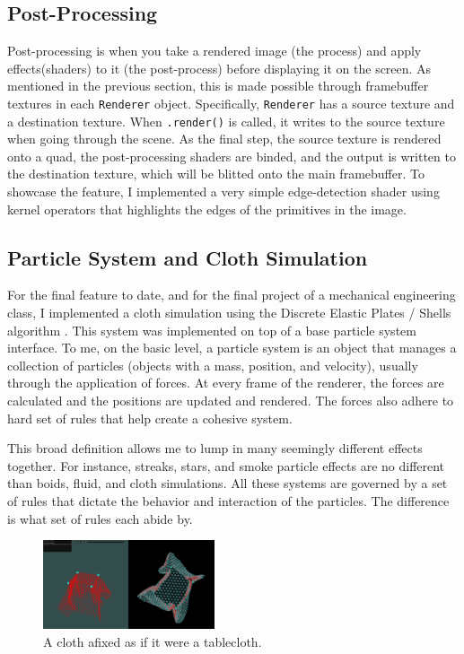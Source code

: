 \documentclass[letterpaper, 10 pt, conference]{ieeeconf}  %
\begin{document}
\subsection {Post-Processing}
Post-processing is when you take a rendered image (the process) and apply effects(shaders) to it (the post-process) before displaying it on the screen. As mentioned in the previous section, this is made possible through framebuffer textures in each \texttt{Renderer} object. Specifically, \texttt{Renderer} has a source texture and a destination texture. When \texttt{.render()} is called, it writes to the source texture when going through the scene. As the final step, the source texture is rendered onto a quad, the post-processing shaders are binded, and the output is written to the destination texture, which will be blitted onto the main framebuffer. To showcase the feature, I implemented a very simple edge-detection shader using kernel operators that highlights the edges of the primitives in the image. 

\subsection {Particle System and Cloth Simulation}
For the final feature to date, and for the final project of a mechanical engineering class, I implemented a cloth simulation using the Discrete Elastic Plates / Shells algorithm\cite{baraff1998large} \cite{Grinspun2003discrete}. This system was implemented on top of a base particle system interface. To me, on the basic level, a particle system is an object that manages a collection of particles (objects with a mass, position, and velocity), usually through the application of forces. At every frame of the renderer, the forces are calculated and the positions are updated and rendered. The forces also adhere to hard set of rules that help create a cohesive system.

This broad definition allows me to lump in many seemingly different effects together. For instance, streaks, stars, and smoke particle effects are no different than boids\cite{reynolds1987flocks}, fluid\cite{stam1999stable}, and cloth simulations. All these systems are governed by a set of rules that dictate the behavior and interaction of the particles. The difference is what set of rules each abide by. 

\begin{figure}
        \centering
        \includegraphics[width=0.45\textwidth]{cool1.PNG}
        \caption{A cloth afixed as if it were a tablecloth.} \label{fig:cloth}
\end{figure}
\end{document}
